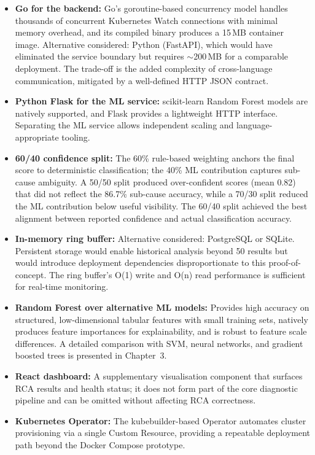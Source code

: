 \begin{itemize}
    \item \textbf{Go for the backend:} Go's goroutine-based concurrency model handles thousands of concurrent Kubernetes Watch connections with minimal memory overhead, and its compiled binary produces a 15\,MB container image. Alternative considered: Python (FastAPI), which would have eliminated the service boundary but requires $\sim$200\,MB for a comparable deployment. The trade-off is the added complexity of cross-language communication, mitigated by a well-defined HTTP JSON contract.
    \item \textbf{Python Flask for the ML service:} scikit-learn Random Forest models are natively supported, and Flask provides a lightweight HTTP interface. Separating the ML service allows independent scaling and language-appropriate tooling.
    \item \textbf{60/40 confidence split:} The 60\% rule-based weighting anchors the final score to deterministic classification; the 40\% ML contribution captures sub-cause ambiguity. A 50/50 split produced over-confident scores (mean 0.82) that did not reflect the 86.7\% sub-cause accuracy, while a 70/30 split reduced the ML contribution below useful visibility. The 60/40 split achieved the best alignment between reported confidence and actual classification accuracy.
    \item \textbf{In-memory ring buffer:} Alternative considered: PostgreSQL or SQLite. Persistent storage would enable historical analysis beyond 50 results but would introduce deployment dependencies disproportionate to this proof-of-concept. The ring buffer's O(1) write and O(n) read performance is sufficient for real-time monitoring.
    \item \textbf{Random Forest over alternative ML models:} Provides high accuracy on structured, low-dimensional tabular features with small training sets, natively produces feature importances for explainability, and is robust to feature scale differences. A detailed comparison with SVM, neural networks, and gradient boosted trees is presented in Chapter~3.
    \item \textbf{React dashboard:} A supplementary visualisation component that surfaces RCA results and health status; it does not form part of the core diagnostic pipeline and can be omitted without affecting RCA correctness.
    \item \textbf{Kubernetes Operator:} The kubebuilder-based Operator automates cluster provisioning via a single Custom Resource, providing a repeatable deployment path beyond the Docker Compose prototype.
\end{itemize}


